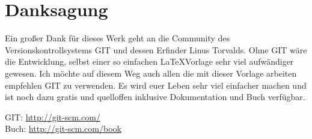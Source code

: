 \chapter*{Danksagung}

Ein großer Dank für dieses Werk geht an die Community des Versionskontrollsystems GIT und dessen Erfinder Linus Torvalds. Ohne GIT wäre die Entwicklung, selbst einer so einfachen \LaTeX Vorlage sehr viel aufwändiger gewesen. Ich möchte auf diesem Weg auch allen die mit dieser Vorlage arbeiten empfehlen GIT zu verwenden. Es wird euer Leben sehr viel einfacher machen und ist noch dazu gratis und quelloffen inklusive Dokumentation und Buch verfügbar.
\begin{center}
GIT: \url{http://git-scm.com/} \\
Buch: \url{http://git-scm.com/book}
\end{center}
\newpage